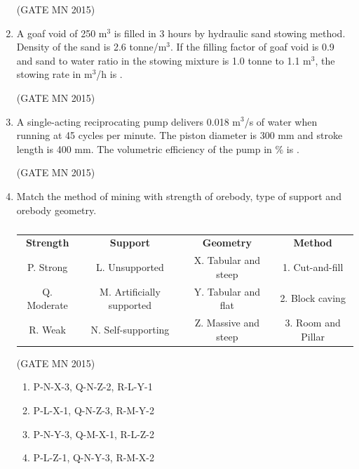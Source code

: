 \documentclass[journal]{IEEEtran}
\begin{document}
\begin{enumerate}
\hfill(GATE MN 2015)


\item A goaf void of 250 m$^{3}$ is filled in 3 hours by hydraulic sand stowing method. Density of the sand is 2.6 tonne/m$^{3}$. If the filling factor of goaf void is 0.9 and sand to water ratio in the stowing mixture is 1.0 tonne to 1.1 m$^{3}$, the stowing rate in m$^{3}$/h is \underline{\hspace{2cm}}.  


	\hfill(GATE MN 2015)

\item A single-acting reciprocating pump delivers 0.018 m$^{3}$/s of water when running at 45 cycles per minute. The piston diameter is 300 mm and stroke length is 400 mm. The volumetric efficiency of the pump in \% is \underline{\hspace{2cm}}. 

	\hfill(GATE MN 2015)


\item Match the method of mining with strength of orebody, type of support and orebody geometry.  


\begin{table}[H]
    \centering\normalsize
	\begin{tabular}{cccc}
		\textbf{Strength} &\textbf{Support} & \textbf{Geometry}& \textbf{Method}\\
 P. Strong & L. Unsupported & X. Tabular and steep & 1. Cut-and-fill \\
Q. Moderate &  M. Artificially supported    &  Y. Tabular and flat  & 2. Block caving \\
 R. Weak& N. Self-supporting  & Z. Massive and steep & 3. Room and Pillar \\

\end{tabular}
\caption{}
    \label{tab:Q49}
\end{table}

\hfill(GATE MN 2015)
\begin{enumerate}
\item P-N-X-3, Q-N-Z-2, R-L-Y-1  
\item P-L-X-1, Q-N-Z-3, R-M-Y-2  
\item P-N-Y-3, Q-M-X-1, R-L-Z-2  
\item P-L-Z-1, Q-N-Y-3, R-M-X-2  
\end{enumerate}



\end{enumerate}
\end{document}
